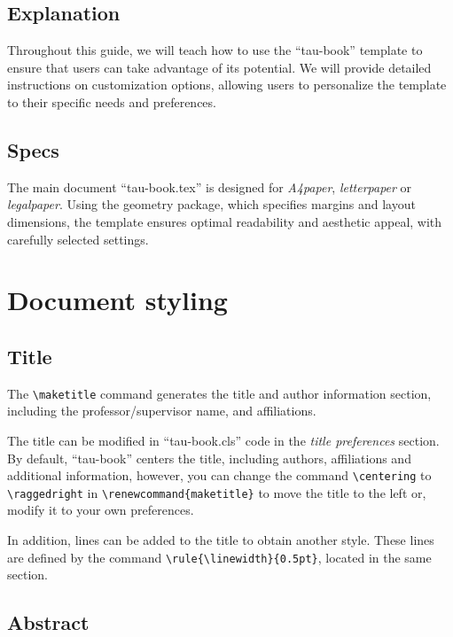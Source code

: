 \documentclass[10pt,a4paper,twoside]{tau-book}
\begin{document}
    \subsection{Explanation}	

        Throughout this guide, we will teach how to use the ``tau-book'' template to ensure that users can take advantage of its potential. We will provide detailed instructions on customization options, allowing users to personalize the template to their specific needs and preferences.

    \subsection{Specs}

        The main document ``tau-book.tex'' is designed for \textit{A4paper}, \textit{letterpaper} or \textit{legalpaper}. Using the geometry package, which specifies margins and layout dimensions, the template ensures optimal readability and aesthetic appeal, with carefully selected settings.

\section{Document styling}

	\subsection{Title}
	
            The \verb*|\maketitle| command generates the title and author information section, including the professor/supervisor name, and affiliations.
		
            The title can be modified in ``tau-book.cls'' code in the \textit{title preferences} section. By default, ``tau-book'' centers the title, including authors, affiliations and additional information, however, you can change the command \verb*|\centering| to \verb*|\raggedright| in \verb*|\renewcommand{maketitle}| to move the title to the left or, modify it to your own preferences. 
		
            In addition, lines can be added to the title to obtain another style. These lines are defined by the command \verb*|\rule{\linewidth}{0.5pt}|, located in the same section.
	
	\subsection{Abstract}
	
\end{document}
